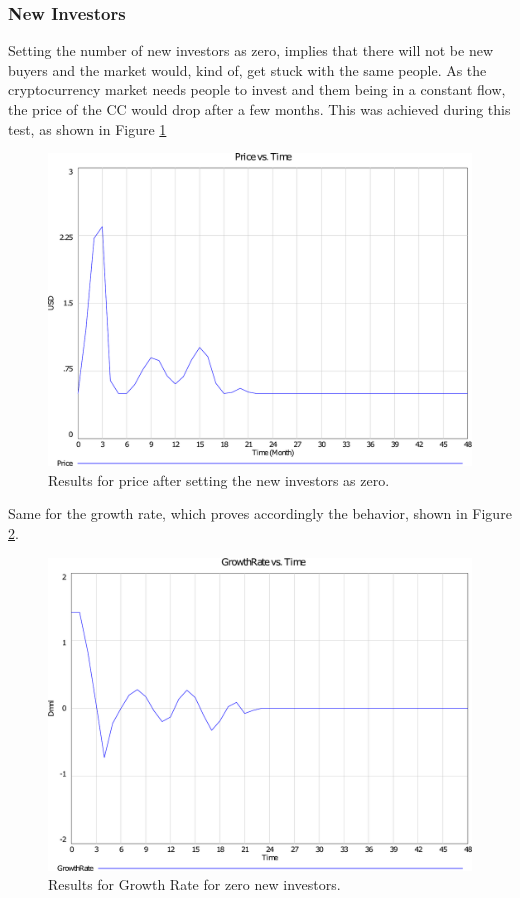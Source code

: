 	\subsubsection{New Investors}
    	Setting the number of new investors as zero, implies that there will not be new buyers and the market would, kind of, get stuck with the same people. As the cryptocurrency market needs people to invest and them being in a constant flow, the price of the CC would drop after a few months. This was achieved during this test, as shown in Figure \ref{img:extrinvprice}
        \begin{figure}[H]
        	\centering
            \includegraphics[scale=0.3]{files/ExtrInvestPrice.pdf}
            \caption{Results for price after setting the new investors as zero.}
            \label{img:extrinvprice}
		\end{figure}
        Same for the growth rate, which proves accordingly the behavior, shown in Figure \ref{img:extrinvgrowth}.
        \begin{figure}[H]
        	\centering
            \includegraphics[scale=.3]{files/ExtrInvestGrowth.pdf}
            \caption{Results for Growth Rate for zero new investors.}
            \label{img:extrinvgrowth}
        \end{figure}
